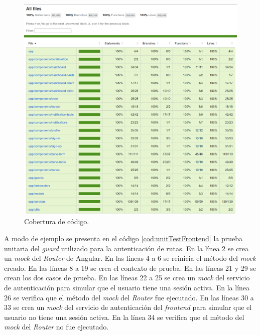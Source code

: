 \begin{figure}[H]
	\centering
	\includegraphics[width=.9\textwidth]{./Figures/Frontend code coverage.png}
	\caption{Cobertura de código.}
	\label{fig:codeCoverageFrontend}
\end{figure}

A modo de ejemplo se presenta en el código \ref{cod:unitTestFrontend} la prueba unitaria del \emph{guard} utilizado para la autenticación de rutas. En la línea 2  se crea un \emph{mock} del \textit{Router} de Angular. En las líneas 4 a 6 se reinicia el método del \emph{mock} creado. En las líneas 8 a 19 se crea el contexto de prueba. En las líneas 21 y 29 se crean los dos casos de prueba. En las líneas 22 a 25 se crea un \emph{mock} del servicio de autenticación para simular que el usuario tiene una sesión activa. En la línea 26 se verifica que el método del \emph{mock} del \textit{Router} fue ejecutado. En las líneas 30 a 33 se crea un \emph{mock} del servicio de autenticación del \emph{frontend} para simular que el usuario no tiene una sesión activa. En la línea 34 se verifica que el método del \emph{mock} del \textit{Router} no fue ejecutado.

